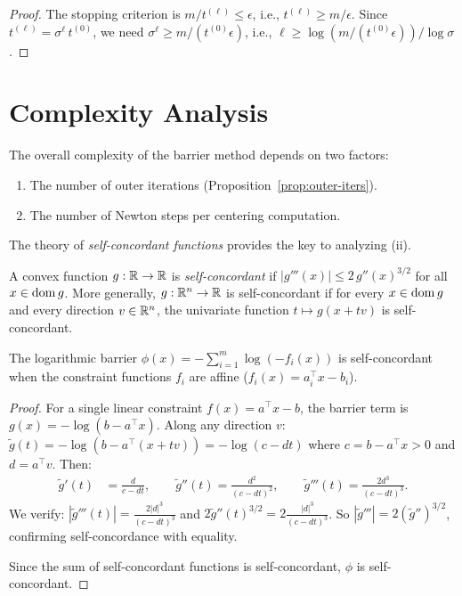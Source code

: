 \documentclass[11pt,a4paper]{article}
\begin{document}
\begin{proof}
The stopping criterion is $m/t^{(\ell)} \le \epsilon$, i.e.,
$t^{(\ell)} \ge m/\epsilon$. Since $t^{(\ell)} = \sigma^\ell\,t^{(0)}$,
we need $\sigma^\ell \ge m/(t^{(0)}\epsilon)$, i.e.,
$\ell \ge \log(m/(t^{(0)}\epsilon))/\log\sigma$.
\end{proof}


\section{Complexity Analysis}\label{sec:complexity}

The overall complexity of the barrier method depends on two factors:
\begin{enumerate}[label=(\roman*)]
  \item The number of outer iterations
    (Proposition~\ref{prop:outer-iters}).
  \item The number of Newton steps per centering computation.
\end{enumerate}

The theory of \emph{self-concordant functions}
\citep{nesterov2004, wright1997} provides the key to analyzing (ii).

\begin{definition}\label{def:self-concordant}
A convex function $g : \mathbb{R} \to \mathbb{R}$ is \emph{self-concordant} if
$|g'''(x)| \le 2\,g''(x)^{3/2}$ for all $x \in \operatorname{dom} g$. More
generally, $g : \mathbb{R}^n \to \mathbb{R}$ is self-concordant if for every
$x \in \operatorname{dom} g$ and every direction $v \in \mathbb{R}^n$, the univariate
function $t \mapsto g(x + tv)$ is self-concordant.
\end{definition}

\begin{proposition}%
\label{prop:barrier-sc}
The logarithmic barrier $\phi(x) = -\sum_{i=1}^m \log(-f_i(x))$ is
self-concordant when the constraint functions $f_i$ are affine
($f_i(x) = a_i^\top x - b_i$).
\end{proposition}

\begin{proof}
For a single linear constraint $f(x) = a^\top x - b$, the barrier
term is $g(x) = -\log(b - a^\top x)$. Along any direction $v$:
$\tilde{g}(t) = -\log(b - a^\top(x + tv)) = -\log(c - dt)$ where
$c = b - a^\top x > 0$ and $d = a^\top v$. Then:
\begin{align*}
  \tilde{g}'(t) &= \frac{d}{c - dt}, \qquad
  \tilde{g}''(t) = \frac{d^2}{(c-dt)^2}, \qquad
  \tilde{g}'''(t) = \frac{2d^3}{(c-dt)^3}.
\end{align*}
We verify: $|\tilde{g}'''(t)| = \frac{2|d|^3}{(c-dt)^3}$ and
$2\tilde{g}''(t)^{3/2} = 2\frac{|d|^3}{(c-dt)^3}$. So
$|\tilde{g}'''| = 2(\tilde{g}'')^{3/2}$, confirming self-concordance
with equality.

Since the sum of self-concordant functions is self-concordant, $\phi$
is self-concordant.
\end{proof}
\end{document}
